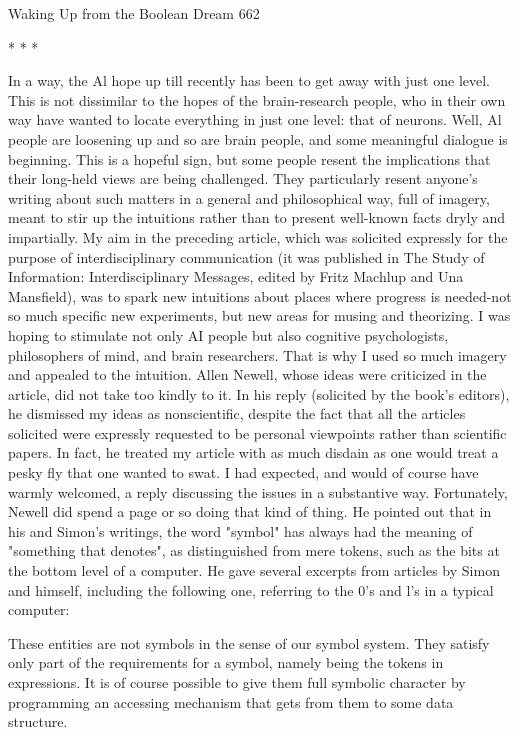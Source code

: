 Waking Up from the Boolean Dream                                                       662

                                        *   *   *

        In a way, the Al hope up till recently has been to get away with just one level.
This is not dissimilar to the hopes of the brain-research people, who in their own way
have wanted to locate everything in just one level: that of neurons. Well, Al people
are loosening up and so are brain people, and some meaningful dialogue is beginning.
This is a hopeful sign, but some people resent the implications that their long-held
views are being challenged. They particularly resent anyone's writing about such
matters in a general and philosophical way, full of imagery, meant to stir up the
intuitions rather than to present well-known facts dryly and impartially.
        My aim in the preceding article, which was solicited expressly for the purpose
of interdisciplinary communication (it was published in The Study of Information:
Interdisciplinary Messages, edited by Fritz Machlup and Una Mansfield), was to
spark new intuitions about places where progress is needed-not so much specific new
experiments, but new areas for musing and theorizing. I was hoping to stimulate not
only AI people but also cognitive psychologists, philosophers of mind, and brain
researchers. That is why I used so much imagery and appealed to the intuition.
        Allen Newell, whose ideas were criticized in the article, did not take too
kindly to it. In his reply (solicited by the book's editors), he dismissed my ideas as
nonscientific, despite the fact that all the articles solicited were expressly requested to
be personal viewpoints rather than scientific papers. In fact, he treated my article with
as much disdain as one would treat a pesky fly that one wanted to swat. I had
expected, and would of course have warmly welcomed, a reply discussing the issues
in a substantive way.
        Fortunately, Newell did spend a page or so doing that kind of thing. He
pointed out that in his and Simon's writings, the word "symbol" has always had the
meaning of "something that denotes", as distinguished from mere tokens, such as the
bits at the bottom level of a computer. He gave several excerpts from articles by
Simon and himself, including the following one, referring to the 0's and l's in a typical
computer:

   These entities are not symbols in the sense of our symbol system. They satisfy
   only part of the requirements for a symbol, namely being the tokens in
   expressions. It is of course possible to give them full symbolic character by
   programming an accessing mechanism that gets from them to some data
   structure.

